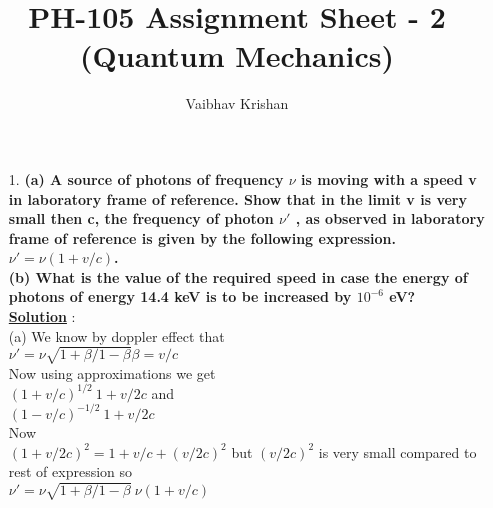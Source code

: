 \documentclass[10pt, a4paper]{article}
\begin{document}
	\title{PH-105 Assignment Sheet - 2 (Quantum Mechanics)}
	\date{}
	\author{Vaibhav Krishan}
	\maketitle
	\newcommand{\angstrom}{\mbox{\normalfont\AA}}
	\begin{enumerate}
		\item[1.] {\bf (a) A source of photons of frequency \begin{math} \nu \end{math} is moving with a speed v in laboratory frame of reference. Show that in the limit v is very small then c, the frequency of photon \begin{math} \nu' \end{math} , as observed in laboratory frame of reference is given by the following expression. \begin{math} \nu' = \nu(1+v/c) \end{math}.\\
(b) What is the value of the required speed in case the energy of photons of energy 14.4 keV is to be increased by \begin{math} 10^{-6} \end{math} eV?}\\
		{\underline {\bf Solution}} :\\
		(a) We know by doppler effect that\\
		\begin{math} \nu' = \nu\sqrt{1+\beta/1-\beta} \beta = v/c \end{math}\\
		Now using approximations we get\\
		\begin{math} (1+v/c)^{1/2} ~ 1+v/2c\end{math} and\\
		\begin{math} (1-v/c)^{-1/2} ~ 1+v/2c\end{math}\\
		Now\\
		\begin{math} (1+v/2c)^2 = 1+v/c + (v/2c)^2 \end{math} but \begin{math} (v/2c)^2 \end{math} is very small compared to rest of expression so\\
		\begin{math} \nu' = \nu\sqrt{1+\beta/1-\beta} ~ \nu(1+v/c)\end{math}\\

\end{enumerate}
\end{document}
